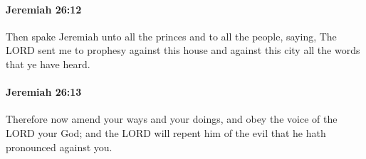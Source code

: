 		\paragraph{Jeremiah 26:12} %
			\label{JEREMIAH-26-12}

			Then spake Jeremiah unto all the princes and to all the people, saying, The LORD sent me to prophesy against this house and against this city all the words that ye have heard.


		\paragraph{Jeremiah 26:13} %
			\label{JEREMIAH-26-13}

			Therefore now amend your ways and your doings, and obey the voice of the LORD your God; and the LORD will repent him of the evil that he hath pronounced against you.


